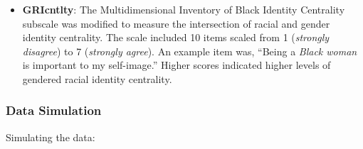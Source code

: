 \documentclass[
]{book}
\begin{document}
\begin{itemize}
\item
  \textbf{GRIcntlty}: The Multidimensional Inventory of Black Identity Centrality subscale \citep{sellers_multidimensional_nodate} was modified to measure the intersection of racial and gender identity centrality. The scale included 10 items scaled from 1 (\emph{strongly disagree}) to 7 (\emph{strongly agree}). An example item was, ``Being a \emph{Black woman} is important to my self-image.'' Higher scores indicated higher levels of gendered racial identity centrality.
\end{itemize}

\hypertarget{data-simulation-1}{%
\subsubsection{Data Simulation}\label{data-simulation-1}}

Simulating the data:
\end{document}

